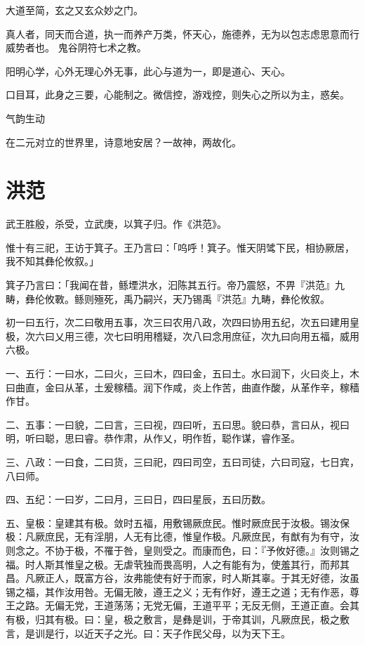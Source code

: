 大道至简，玄之又玄众妙之门。

真人者，同天而合道，执一而养产万类，怀天心，施德养，无为以包志虑思意而行威势者也。
鬼谷阴符七术之教。

阳明心学，心外无理心外无事，此心与道为一，即是道心、天心。

口目耳，此身之三要，心能制之。微信控，游戏控，则失心之所以为主，惑矣。

气韵生动

在二元对立的世界里，诗意地安居？一故神，两故化。

\section{洪范}

武王胜殷，杀受，立武庚，以箕子归。作《洪范》。

惟十有三祀，王访于箕子。王乃言曰：「呜呼！箕子。惟天阴骘下民，相协厥居，我不知其彝伦攸叙。」

箕子乃言曰：「我闻在昔，鲧堙洪水，汩陈其五行。帝乃震怒，不畀『洪范』九畴，彝伦攸斁。鲧则殛死，禹乃嗣兴，天乃锡禹『洪范』九畴，彝伦攸叙。

初一曰五行，次二曰敬用五事，次三曰农用八政，次四曰协用五纪，次五曰建用皇极，次六曰乂用三德，次七曰明用稽疑，次八曰念用庶征，次九曰向用五福，威用六极。

一、五行：一曰水，二曰火，三曰木，四曰金，五曰土。水曰润下，火曰炎上，木曰曲直，金曰从革，土爰稼穑。润下作咸，炎上作苦，曲直作酸，从革作辛，稼穑作甘。

二、五事：一曰貌，二曰言，三曰视，四曰听，五曰思。貌曰恭，言曰从，视曰明，听曰聪，思曰睿。恭作肃，从作乂，明作哲，聪作谋，睿作圣。

三、八政：一曰食，二曰货，三曰祀，四曰司空，五曰司徒，六曰司寇，七日宾，八曰师。

四、五纪：一曰岁，二曰月，三曰日，四曰星辰，五曰历数。

五、皇极：皇建其有极。敛时五福，用敷锡厥庶民。惟时厥庶民于汝极。锡汝保极：凡厥庶民，无有淫朋，人无有比德，惟皇作极。凡厥庶民，有猷有为有守，汝则念之。不协于极，不罹于咎，皇则受之。而康而色，曰：『予攸好德。』汝则锡之福。时人斯其惟皇之极。无虐茕独而畏高明，人之有能有为，使羞其行，而邦其昌。凡厥正人，既富方谷，汝弗能使有好于而家，时人斯其辜。于其无好德，汝虽锡之福，其作汝用咎。无偏无陂，遵王之义；无有作好，遵王之道；无有作恶，尊王之路。无偏无党，王道荡荡；无党无偏，王道平平；无反无侧，王道正直。会其有极，归其有极。曰：皇，极之敷言，是彝是训，于帝其训，凡厥庶民，极之敷言，是训是行，以近天子之光。曰：天子作民父母，以为天下王。

